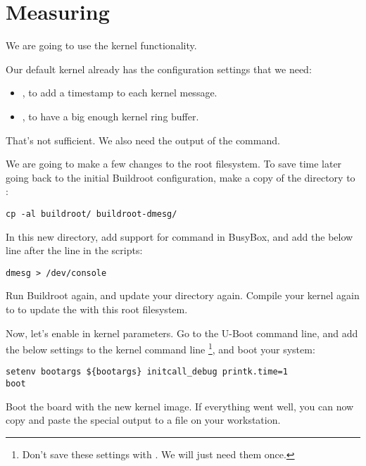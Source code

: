 
\section{Measuring}

We are going to use the kernel  functionality.

Our default kernel already has the configuration settings that we need:
\begin{itemize}
\item {}, to add a timestamp to each kernel
message.
\item {}, to have a big enough kernel ring buffer.
\end{itemize}

That's not sufficient. We also need the output of the 
command.

We are going to make a few changes to the root filesystem. To save time
later going back to the initial Buildroot configuration, make a copy
of the  directory to :

\begin{verbatim}
cp -al buildroot/ buildroot-dmesg/
\end{verbatim}

In this new directory, add support for  command in BusyBox,
and add the below line after the  line in the
 scripts:

\begin{verbatim}
dmesg > /dev/console
\end{verbatim}

Run Buildroot again, and update your
 directory again. Compile your
kernel again to to update the  with this root filesystem.

Now, let's enable  in kernel parameters. Go to
the U-Boot command line, and add the below settings to the kernel command line
\footnote{Don't save these settings with . We
will just need them once.}, and boot your system:
\begin{verbatim}
setenv bootargs ${bootargs} initcall_debug printk.time=1
boot
\end{verbatim}

Boot the board with the new kernel image. If everything went well,
you can now copy and paste the special  output to
a  file on your workstation.

